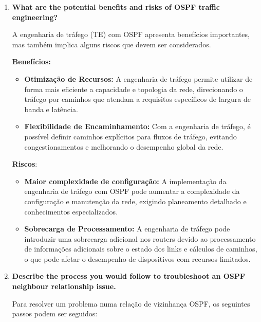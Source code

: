 \documentclass[11pt,english, openright, oneside]{book}
\begin{document}
\begin{enumerate}
  \item \textbf{What are the potential benefits and risks of OSPF traffic engineering?}
  \vspace{0.2cm}

  \par A engenharia de tráfego (TE) com OSPF apresenta benefícios importantes, mas também implica alguns riscos que devem ser considerados.
  \vspace{0.2cm}

  \textbf{Benefícios:}
  \vspace{0.2cm}
  \begin{itemize}
      \item \textbf{Otimização de Recursos:} A engenharia de tráfego permite utilizar de forma mais eficiente a capacidade e topologia da rede, direcionando o tráfego por caminhos que atendam a requisitos específicos de largura de banda e latência.
      \item \textbf{Flexibilidade de Encaminhamento:} Com a engenharia de tráfego, é possível definir caminhos explícitos para fluxos de tráfego, evitando congestionamentos e melhorando o desempenho global da rede.
  \end{itemize}
  \vspace{0.2cm}

  \newpage
  \textbf{Riscos}:
  \vspace{0.2cm}
  \begin{itemize}
      \item \textbf{Maior complexidade de configuração:} A implementação da engenharia de tráfego com OSPF pode aumentar a complexidade da configuração e manutenção da rede, exigindo planeamento detalhado e conhecimentos especializados.
      \item \textbf{Sobrecarga de Processamento:} A engenharia de tráfego pode introduzir uma sobrecarga adicional nos routers devido ao processamento de informações adicionais sobre o estado dos links e cálculos de caminhos, o que pode afetar o desempenho de dispositivos com recursos limitados.
  \end{itemize}
  \vspace{0.2cm}
  
  \item \textbf{Describe the process you would follow to troubleshoot an OSPF neighbour relationship issue.}
  \vspace{0.2cm}

  Para resolver um problema numa relação de vizinhança OSPF, os seguintes passos podem ser seguidos:
  \vspace{0.2cm}


\end{enumerate}
\end{document}
